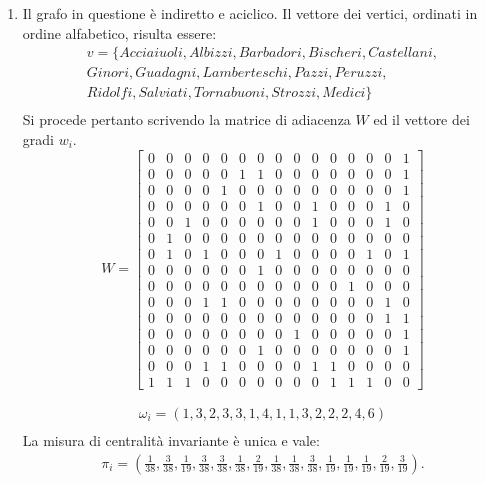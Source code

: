 \documentclass[13pt,largemargins]{homework}
\begin{document}
\begin{enumerate}[label=(\alph*)]
\item %
Il grafo in questione è indiretto e aciclico. Il vettore dei vertici, ordinati in ordine alfabetico, risulta essere:
\begin{gather*}
v = \{ Acciaiuoli, Albizzi, Barbadori, Bischeri, Castellani,\\
Ginori, Guadagni, Lamberteschi, Pazzi, Peruzzi,\\ Ridolfi, Salviati, Tornabuoni, Strozzi, Medici\}\\
\end{gather*}
Si procede pertanto scrivendo la matrice di adiacenza \(W\) ed il vettore dei gradi \(w_i\). 
\[W=\begin{bmatrix}
	0 & 0 & 0 & 0 & 0 & 0 & 0 & 0 & 0 & 0 & 0 & 0 & 0 & 0 & 1\\
	0 & 0 & 0 & 0 & 0 & 1 & 1 & 0 & 0 & 0 & 0 & 0 & 0 & 0 & 1\\
	0 & 0 & 0 & 0 & 1 & 0 & 0 & 0 & 0 & 0 & 0 & 0 & 0 & 0 & 1\\
	0 & 0 & 0 & 0 & 0 & 0 & 1 & 0 & 0 & 1 & 0 & 0 & 0 & 1 & 0\\
	0 & 0 & 1 & 0 & 0 & 0 & 0 & 0 & 0 & 1 & 0 & 0 & 0 & 1 & 0\\
	0 & 1 & 0 & 0 & 0 & 0 & 0 & 0 & 0 & 0 & 0 & 0 & 0 & 0 & 0\\
	0 & 1 & 0 & 1 & 0 & 0 & 0 & 1 & 0 & 0 & 0 & 0 & 1 & 0 & 1\\
	0 & 0 & 0 & 0 & 0 & 0 & 1 & 0 & 0 & 0 & 0 & 0 & 0 & 0 & 0\\
	0 & 0 & 0 & 0 & 0 & 0 & 0 & 0 & 0 & 0 & 0 & 1 & 0 & 0 & 0\\
	0 & 0 & 0 & 1 & 1 & 0 & 0 & 0 & 0 & 0 & 0 & 0 & 0 & 1 & 0\\
	0 & 0 & 0 & 0 & 0 & 0 & 0 & 0 & 0 & 0 & 0 & 0 & 0 & 1 & 1\\
	0 & 0 & 0 & 0 & 0 & 0 & 0 & 0 & 1 & 0 & 0 & 0 & 0 & 0 & 1\\
	0 & 0 & 0 & 0 & 0 & 0 & 1 & 0 & 0 & 0 & 0 & 0 & 0 & 0 & 1\\
	0 & 0 & 0 & 1 & 1 & 0 & 0 & 0 & 0 & 1 & 1 & 0 & 0 & 0 & 0\\	
	1 & 1 & 1 & 0 & 0 & 0 & 0 & 0 & 0 & 0 & 1 & 1 & 1 & 0 & 0
	\end{bmatrix}\]
	
	\begin{gather*}
	\omega_i = (1, 3, 2, 3, 3, 1, 4, 1, 1, 3, 2, 2, 2, 4, 6)\\
	\end{gather*}
La misura di centralità invariante è unica e vale: 
\begin{gather*}
	\pi_i = ( \frac{1}{38}, \frac{3}{38}, \frac{1}{19}, \frac{3}{38}, \frac{3}{38}, \frac{1}{38}, \frac{2}{19}, \frac{1}{38}, \frac{1}{38}, \frac{3}{38}, \frac{1}{19}, \frac{1}{19}, \frac{1}{19}, \frac{2}{19}, \frac{3}{19}).\\
\end{gather*}
	

\end{enumerate}
\end{document}
